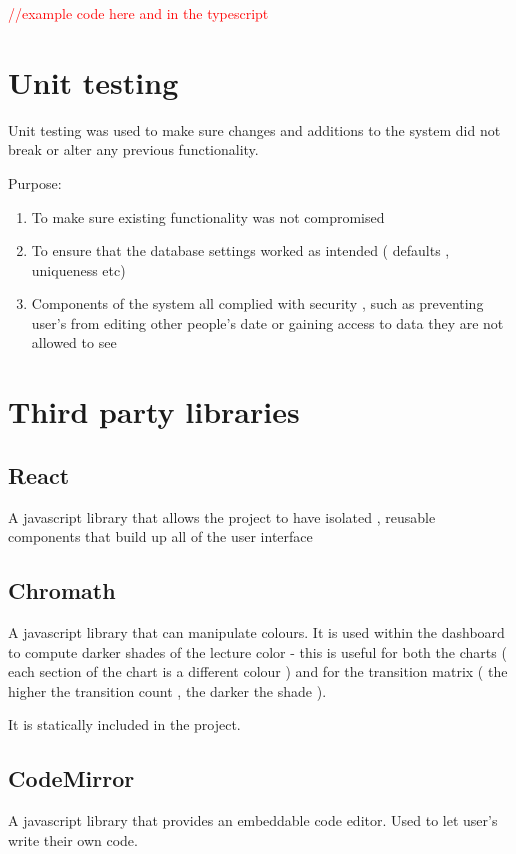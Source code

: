 \textcolor{red}{//example code here and in the typescript}

\section{Unit testing}
Unit testing was used to make sure changes and additions to the system did not break or alter any previous functionality.

Purpose:
\begin{enumerate}
	\item To make sure existing functionality was not compromised
	\item To ensure that the database settings worked as intended ( defaults , uniqueness etc)
	\item Components of the system all complied with security , such as preventing user's from editing other people's date or gaining access to data they are not allowed to see
\end{enumerate}




\section{Third party libraries} \label{libs}

\subsection{React}
A javascript library that allows the project to have isolated , reusable components that build up all of the user interface

\subsection{Chromath} 
A javascript library that can manipulate colours. It is used within the dashboard to compute darker shades of the lecture color - this is useful for both the charts ( each section of the chart is a different colour ) and for the transition matrix ( the higher the transition count , the darker the shade ).

	It is statically included in the project.
	
\subsection{CodeMirror}
A javascript library that provides an embeddable code editor. Used to let user's write their own code.

